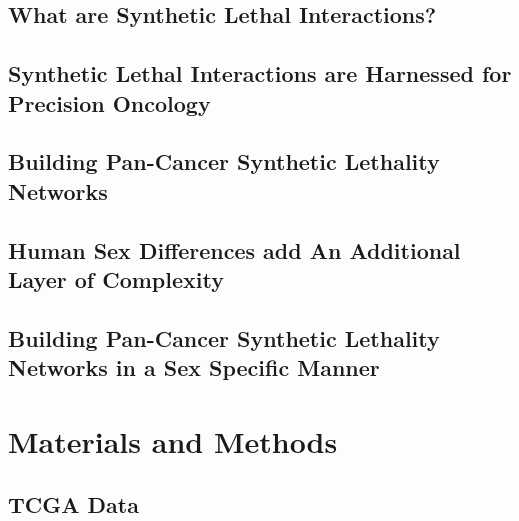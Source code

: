 \documentclass[10pt]{article}
\begin{document}
	\subsection{What are Synthetic Lethal Interactions?}

	\subsection{Synthetic Lethal Interactions are Harnessed for Precision Oncology}

	\subsection{Building Pan-Cancer Synthetic Lethality Networks}

	\subsection{Human Sex Differences add An Additional Layer of Complexity}

	\subsection{Building Pan-Cancer Synthetic Lethality Networks in a Sex Specific Manner} 

\newpage
\section{Materials and Methods} 


	\subsection{TCGA Data}
	
\end{document}
